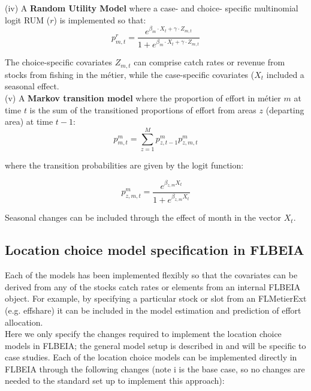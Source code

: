 \documentclass[12pt, halfline, a4paper]{ouparticle}
\begin{document}
(iv) A \textbf{Random Utility Model} where a case- and choice- specific
multinomial logit RUM ($r$) is implemented so that:  
\begin{equation}
p^{r}_{m,t} = \frac{e^{\beta_{m} \cdot X_{t} + \gamma \cdot Z_{m,t}}}{1 + 
	e^{\beta_{m} \cdot X_{t} + \gamma \cdot Z_{m,t}}}
\label{eqn:rum}
\end{equation} 

The choice-specific covariates $Z_{m,t}$ can comprise catch rates or revenue
from stocks from fishing in the métier, while the case-specific covariates
($X_{t}$ included a seasonal effect. \\

(v) A \textbf{Markov transition model} where the proportion of effort in métier
$m$ at time $t$ is the sum of the transitioned proportions of effort from areas
$z$ (departing area) at time $t-1$:
\begin{equation}
p^m_{m,t} = \sum_{z = 1}^{M} p^m_{z, t-1} p^m_{z,m,t}
\end{equation}

where the transition probabilities are given by the logit function:

\begin{equation}
p^m_{z,m,t} = \frac{e^{\beta_{z,m} X_{t}}}{1+e^{\beta_{z,m} X_{t}}}
\end{equation}

Seasonal changes can be included through the effect of month in the vector
$X_t$. 

\subsection{Location choice model specification in FLBEIA}

Each of the models has been implemented flexibly so that the covariates can be
derived from any of the stocks catch rates or elements from an internal FLBEIA
object. For example, by specifying a particular stock or slot from an
FLMetierExt (e.g. effshare) it can be included in the model estimation and
prediction of effort allocation. \\

Here we only specify the changes required to implement the location choice
models in FLBEIA; the general model setup is described in \cite{Garcia2017a}
and will be specific to case studies. Each of the location choice models can be
implemented directly in FLBEIA through the following changes (note i is the
base case, so no changes are needed to the standard set up to implement this
approach): \\
\end{document}
